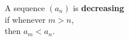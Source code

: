 \documentclass[border=6pt]{standalone}
\begin{document}
\parbox{2in}{A sequence $(a_n)$ is \textbf{decreasing} \\
  \null\quad if whenever $m > n$, \\
  \null\quad\quad then $a_m < a_n$.}
\end{document}

